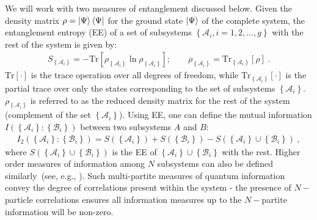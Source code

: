 We will work with two measures of entanglement discussed below.
Given the density matrix \(\rho = \ket{\Psi}\bra{\Psi}\) for the ground state \(\ket{\Psi}\) of the complete system, the entanglement entropy (EE) of a set of subsystems \(\left\{ \mathcal{A}_i, i=1,2,\ldots,g \right\}\) with the rest of the system is given by:
\begin{equation}\begin{aligned}
	S_{\left\{ \mathcal{A}_i\right\}} = - \text{Tr}\left[\rho_{\left\{ \mathcal{A}_i\right\}} \ln \rho_{\left\{ \mathcal{A}_i\right\}}\right];\qquad \rho_{\left\{ \mathcal{A}_i\right\}} = \text{Tr}_{\left\{ \mathcal{A}_i\right\}}\left[\rho\right] ~.
\end{aligned}\end{equation}
\(\text{Tr}\left[\cdot\right] \) is the trace operation over all degrees of freedom, while \(\text{Tr}_{\left\{ \mathcal{A}_i\right\}}\left[\cdot\right]\) is the partial trace over only the states corresponding to the set of subsystems \({\left\{ \mathcal{A}_i\right\}}\).
\(\rho_{\left\{ \mathcal{A}_i\right\}}\) is referred to as the reduced density matrix for the rest of the system (complement of the set \(\left\{ \mathcal{A}_i\right\}\)).
Using EE, one can define the mutual information \(I(\left\{ \mathcal{A}_i\right\}:\left\{ \mathcal{B}_i\right\})\) between two subsystems \(A\) and \(B\):
\begin{equation}\begin{aligned}
	\label{mut-inf}
	I_2\left(\left\{ \mathcal{A}_i\right\}:\left\{ \mathcal{B}_i\right\}\right) = S(\left\{ \mathcal{A}_i\right\}) + S(\left\{ \mathcal{B}_i\right\}) - S(\left\{ \mathcal{A}_i\right\}\cup \left\{ \mathcal{B}_i\right\})~,
\end{aligned}\end{equation}
where \(S(\left\{ \mathcal{A}_i\right\}\cup \left\{ \mathcal{B}_i\right\})\) is the EE of \(\left\{ \mathcal{A}_i\right\}\cup \left\{ \mathcal{B}_i\right\}\) with the rest.
Higher order measures of information among $N$ subsystems can also be defined similarly~(see, e.g., \cite{siddhartha_TEE}). Such multi-partite measures of quantum information convey the degree of correlations present within the system - the presence of \(N-\)particle correlations ensures all information measures up to the \(N-\)partite information will be non-zero.

